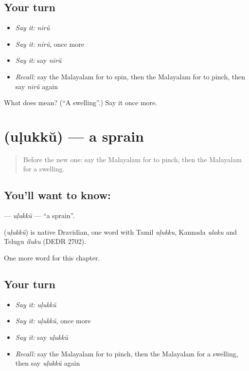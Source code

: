 \subsection*{Your turn}
\begin{itemize}
\raggedright
  \item \emph{Say it:} \emph{nīrŭ}
  \item \emph{Say it:} \emph{nīrŭ}, once more
  \item \emph{Say it:} say \emph{nīrŭ}
  \item \emph{Recall:} say the Malayalam for to spin, then the Malayalam for to pinch, then say \emph{nīrŭ} again
\end{itemize}

\begin{tcolorbox}[breakable,colback=teal!4,colframe=teal!35!black,title={Before you move on}]
What does  mean? (\textquotedblleft{}A swelling\textquotedblright{}.) Say it once more.
\end{tcolorbox}
\section[\texorpdfstring{\ml{ഉളുക്ക്} (uḷukkŭ)}{ഉളുക്ക് (uḷukkŭ)}]{ (uḷukkŭ) — a sprain}

\label{lesson:ML-C274-ulukku}



\begin{quote}
Before the new one: say the Malayalam for to pinch, then the Malayalam for a swelling.
\end{quote}

\subsection*{You'll want to know: }
\textbf{} — \emph{uḷukkŭ} — \textquotedblleft{}a sprain\textquotedblright{}.

\begin{cousinweb}
\textbf{} (\emph{uḷukkŭ}) is native Dravidian, one word with Tamil \emph{uḷukku}, Kannada \emph{ulaku} and Telugu \emph{iluku} (DEDR 2702).
\end{cousinweb}

\begin{grammarlens}[title={What you've built}]
One more word for this chapter.
\end{grammarlens}

\subsection*{Your turn}
\begin{itemize}
\raggedright
  \item \emph{Say it:} \emph{uḷukkŭ}
  \item \emph{Say it:} \emph{uḷukkŭ}, once more
  \item \emph{Say it:} say \emph{uḷukkŭ}
  \item \emph{Recall:} say the Malayalam for to pinch, then the Malayalam for a swelling, then say \emph{uḷukkŭ} again
\end{itemize}

